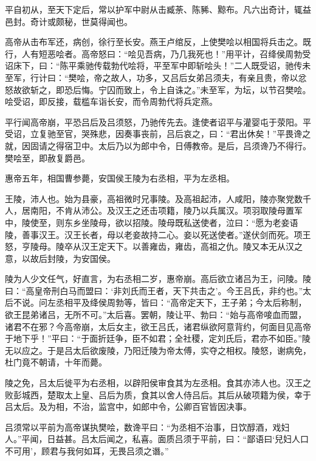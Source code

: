 \documentclass[12pt,UTF8]{ctexbook}
\begin{document}
平自初从，至天下定后，常以护军中尉从击臧荼、陈豨、黥布。凡六出奇计，辄益邑封。奇计或颇秘，世莫得闻也。



高帝从击布军还，病创，徐行至长安。燕王卢绾反，上使樊哙以相国将兵击之。既行，人有短恶哙者。高帝怒曰：“哙见吾病，乃几我死也！”用平计，召绛侯周勃受诏床下，曰：“陈平乘驰传载勃代哙将，平至军中即斩哙头！”二人既受诏，驰传未至军，行计曰：“樊哙，帝之故人，功多，又吕后女弟吕须夫，有亲且贵，帝以忿怒故欲斩之，即恐后悔。宁囚而致上，令上自诛之。”未至军，为坛，以节召樊哙。哙受诏，即反接，载槛车诣长安，而令周勃代将兵定燕。



平行闻高帝崩，平恐吕后及吕须怒，乃驰传先去。逢使者诏平与灌婴屯于荥阳。平受诏，立复驰至官，哭殊悲，因奏事丧前，吕后哀之，曰：“君出休矣！”平畏谗之就，因固请之得宿卫中。太后乃以为郎中令，日傅教帝。是后，吕须谗乃不得行。樊哙至，即赦复爵邑。



惠帝五年，相国曹参薨，安国侯王陵为右丞相，平为左丞相。



王陵，沛人也。始为县豪，高祖微时兄事陵。及高祖起沛，人咸阳，陵亦聚党数千人，居南阳，不肯从沛公。及汉王之还击项籍，陵乃以兵属汉。项羽取陵母置军中，陵使至，则东乡坐陵母，欲以招陵。陵母既私送使者，泣曰：“愿为老妾语陵，善事汉王。汉王长者，母以老妾故持二心。妾以死送使者。”遂伏剑而死。项王怒，亨陵母。陵卒从汉王定天下。以善雍齿，雍齿，高祖之仇。陵又本无从汉之意，以故后封陵，为安国侯。



陵为人少文任气，好直言，为右丞相二岁，惠帝崩。高后欲立诸吕为王，问陵。陵曰：“高皇帝刑白马而盟曰：‘非刘氏而王者，天下共击之’。今王吕氏，非约也。”太后不说。问左丞相平及绛侯周勃等，皆曰：“高帝定天下，王子弟；今太后称制，欲王昆弟诸吕，无所不可。”太后喜。罢朝，陵让平、勃曰：“始与高帝唼血而盟，诸君不在邪？今高帝崩，太后女主，欲王吕氏，诸君纵欲阿意背约，何面目见高帝于地下乎！”平曰：“于面折廷争，臣不如君；全社稷，定刘氏后，君亦不如臣。”陵无以应之。于是吕太后欲废陵，乃阳迁陵为帝太傅，实夺之相权。陵怒，谢病免，杜门竟不朝请，十年而薨。



陵之免，吕太后徙平为右丞相，以辟阳侯审食其为左丞相。食其亦沛人也。汉王之败彭城西，楚取太上皇、吕后为质，食其以舍人侍吕后。其后从破项籍为侯，幸于吕太后。及为相，不治，监宫中，如郎中令，公卿百官皆因决事。



吕须常以平前为高帝谋执樊哙，数谗平曰：“为丞相不治事，日饮醇酒，戏妇人。”平闻，日益甚。吕太后闻之，私喜。面质吕须于平前，曰：“鄙语曰‘兒妇人口不可用’，顾君与我何如耳，无畏吕须之谮。”
\end{document}
